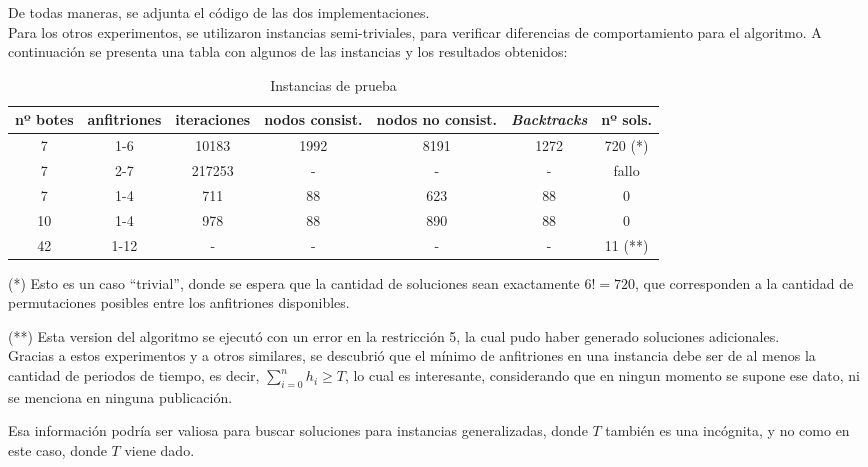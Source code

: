 \documentclass[letter, 10pt]{article}
\begin{document}
De todas maneras, se adjunta el código de las dos implementaciones.\\

Para los otros experimentos, se utilizaron instancias semi-triviales, para verificar diferencias de comportamiento para el algoritmo. A continuación se presenta una tabla con algunos de las instancias y los resultados obtenidos:


\begin{table}[h!]
  \begin{center}
	\begin{tabular}{|c|c|c|c|c|c|c|}
	\hline
	nº botes & anfitriones & iteraciones & nodos consist. & nodos no consist. & \textit{Backtracks} & nº sols. \\ \hline
	
	7 & 1-6 & 10183 & 1992 & 8191 & 1272 & 720 (*)\\ \hline
	7 & 2-7 & 217253 & - & - & - & fallo\\ \hline
	7 & 1-4 & 711 & 88 & 623 & 88 & 0 \\ \hline
	10 & 1-4 & 978 & 88 & 890 & 88 & 0 \\ \hline
	42 & 1-12 & - & - & - & - & 11 (**)\\ \hline
	
	\end{tabular}
  \end{center}
  \caption{Instancias de prueba}
\end{table}

(*) Esto es un caso ``trivial'', donde se espera que la cantidad de soluciones sean exactamente $6! = 720$, que corresponden a la cantidad de permutaciones posibles entre los anfitriones disponibles.

(**) Esta version del algoritmo se ejecutó con un error en la restricción 5, la cual pudo haber generado soluciones adicionales.\\

Gracias a estos experimentos y a otros similares, se descubrió que el mínimo de anfitriones en una instancia debe ser de al menos la cantidad de periodos de tiempo, es decir, $\sum_{i=0}^{n} h_i \geq T$, lo cual es interesante, considerando que en ningun momento se supone ese dato, ni se menciona en ninguna publicación.

Esa información podría ser valiosa para buscar soluciones para instancias generalizadas, donde $T$ también es una incógnita, y no como en este caso, donde $T$ viene dado.\\
\end{document}
